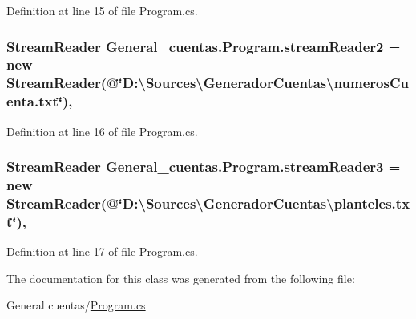 Definition at line 15 of file Program.\-cs.

\hypertarget{class_general__cuentas_1_1_program_ae5b014ec3c416ce64f622ba554226c7d}{
\subsubsection[{stream\-Reader2}]{\setlength{\rightskip}{0pt plus 5cm}Stream\-Reader General\-\_\-cuentas.\-Program.\-stream\-Reader2 = new Stream\-Reader(@\char`\"{}D\-:\textbackslash{}\-Sources\textbackslash{}\-Generador\-Cuentas\textbackslash{}numeros\-Cuenta.\-txt\char`\"{})\hspace{0.3cm}{\ttfamily [static]}, {\ttfamily [private]}}}\label{class_general__cuentas_1_1_program_ae5b014ec3c416ce64f622ba554226c7d}


Definition at line 16 of file Program.\-cs.

\hypertarget{class_general__cuentas_1_1_program_a558196b9a618e6a6fb5ac25915910e96}{
\subsubsection[{stream\-Reader3}]{\setlength{\rightskip}{0pt plus 5cm}Stream\-Reader General\-\_\-cuentas.\-Program.\-stream\-Reader3 = new Stream\-Reader(@\char`\"{}D\-:\textbackslash{}\-Sources\textbackslash{}\-Generador\-Cuentas\textbackslash{}planteles.\-txt\char`\"{})\hspace{0.3cm}{\ttfamily [static]}, {\ttfamily [private]}}}\label{class_general__cuentas_1_1_program_a558196b9a618e6a6fb5ac25915910e96}


Definition at line 17 of file Program.\-cs.



The documentation for this class was generated from the following file\-:\begin{DoxyCompactItemize}
\item 
General cuentas/\hyperlink{_general_01cuentas_2_program_8cs}{Program.\-cs}\end{DoxyCompactItemize}
